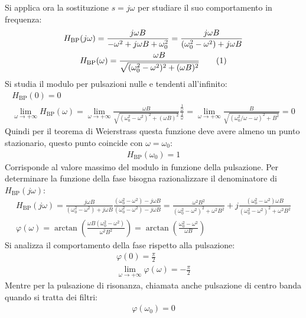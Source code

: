 \documentclass{article}
\newcommand{\tageq}{\tag{\stepcounter{equation}\theequation}}
\numberwithin{equation}{subsection}
\begin{document}
Si applica ora la sostituzione $s=j\omega$ per studiare il suo comportamento in frequenza:
\begin{gather*}
    H_{\mathrm{BP}}(j\omega)=\displaystyle\frac{j\omega B}{-\omega^2+j\omega B+\omega_0^2}=\frac{j\omega B}{(\omega_0^2-\omega^2)+j\omega B}\\
    H_{\mathrm{BP}}(\omega)=\displaystyle\frac{\omega B}{\sqrt{(\omega_0^2-\omega^2)^2+(\omega B)^2}}\tageq
\end{gather*}
Si studia il modulo per pulsazioni nulle e tendenti all'infinito:
\begin{gather*}
    H_{\mathrm{BP}}(0)=0\\
    \lim_{\omega\to+\infty}H_{\mathrm{BP}}(\omega)=\lim_{\omega\to+\infty}\displaystyle\frac{\omega B}{\sqrt{(\omega_0^2-\omega^2)^2+(\omega B)^2}}\frac{\frac{1}\omega}{\frac{1}\omega}=\lim_{\omega\to+\infty}\displaystyle\frac{B}{\sqrt{(\omega_0^2/\omega-\omega)^2+B^2}}=0
\end{gather*}
Quindi per il teorema di Weierstrass questa funzione deve avere almeno un punto stazionario, questo punto coincide con $\omega=\omega_0$:
\begin{gather*}
    H_{\mathrm{BP}}(\omega_0)=1
\end{gather*}
Corrisponde al valore massimo del modulo in funzione della pulsazione. 
Per determinare la funzione della fase bisogna razionalizzare il denominatore di $H_{\mathrm{BP}}(j\omega)$:
\begin{gather*}
    H_{\mathrm{BP}}(j\omega)=\displaystyle\frac{j\omega B}{(\omega_0^2-\omega^2)+j\omega B}\frac{(\omega_0^2-\omega^2)-j\omega B}{(\omega_0^2-\omega^2)-j\omega B}=\frac{\omega^2B^2}{(\omega_0^2-\omega^2)^2+\omega^2B^2}+j\frac{(\omega_0^2-\omega^2)\omega B}{(\omega_0^2-\omega^2)^2+\omega^2B^2}\\
    \varphi(\omega)=\arctan\left(\frac{\omega B(\omega_0^2-\omega^2)}{\omega^2 B^2}\right)=\arctan\left(\frac{\omega_0^2-\omega^2}{\omega B}\right)
\end{gather*}
Si analizza il comportamento della fase rispetto alla pulsazione:
\begin{gather*}
    \varphi(0)=\displaystyle\frac{\pi}{2}\\
    \lim_{\omega\to+\infty}\varphi(\omega)=-\displaystyle\frac{\pi}{2}
\end{gather*}
Mentre per la pulsazione di risonanza, chiamata anche pulsazione di centro banda quando si tratta dei filtri:
\begin{gather*}
    \varphi(\omega_0)=0
\end{gather*}
\end{document}
